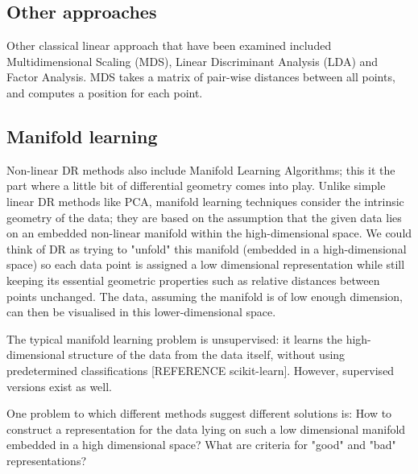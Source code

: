 \documentclass[journal, a4paper]{IEEEtran}
\begin{document}
\subsection{Other approaches}

Other classical linear approach that have been examined included Multidimensional Scaling (MDS), Linear Discriminant Analysis (LDA) and Factor Analysis. 
MDS takes a matrix of pair-wise distances between all points, and computes a position for each point. 


\subsection{Manifold learning}

Non-linear DR methods also include Manifold Learning Algorithms; this it the part where a little bit of differential geometry comes into play.
Unlike simple linear DR methods like PCA, manifold learning techniques consider the intrinsic geometry of the data; they are based on the assumption that the given data lies on an embedded non-linear manifold within the high-dimensional space. We could think of DR as trying to "unfold" this manifold (embedded in a high-dimensional space) so each data point is assigned a low dimensional representation while still keeping its essential geometric properties such as relative distances between points unchanged.
The data, assuming the manifold is of low enough dimension, can then be visualised in this lower-dimensional space.

The typical manifold learning problem is unsupervised: it learns the high-dimensional structure of the data from the data itself, without using predetermined classifications [REFERENCE scikit-learn]. However, supervised versions exist as well.

One problem to which different methods suggest different solutions is: How to construct a representation for the data lying on such a low dimensional manifold embedded in a high dimensional space? What are criteria for "good" and "bad" representations? 
\end{document}

